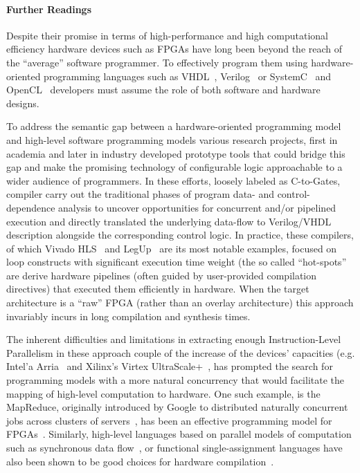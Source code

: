 \paragraph{Further Readings}
Despite their promise in terms of high-performance and high computational efficiency  hardware devices such as FPGAs have long been beyond the reach of the ``average'' software programmer. To effectively program them using hardware-oriented programming languages such as  VHDL~\cite{VHDLBook}, Verilog~\cite{VerilogBook} or SystemC~\cite{SystemC:ISSS01} and OpenCL~\cite{OpenCL} developers must assume the role of both software and hardware designs. 

To address the semantic gap between a hardware-oriented programming model and high-level software programming models various research projects, first in academia and later in industry developed prototype tools that could bridge this gap and make the promising technology of  configurable logic approachable to a wider audience of programmers.  In these efforts, loosely labeled as C-to-Gates, compiler carry out the traditional phases of program data- and control-dependence analysis to uncover opportunities for concurrent and/or pipelined execution and directly translated the underlying data-flow to Verilog/VHDL description alongside the corresponding control logic.   In practice, these compilers, of which Vivado HLS~\cite{Vivado} and LegUp~\cite{LegUp} are its most notable examples, focused on loop constructs with significant execution time weight (the so called ``hot-spots'' are derive hardware pipelines (often guided by user-provided compilation directives) that executed them efficiently in hardware. When the target architecture is a ``raw'' FPGA (rather than an overlay architecture) this approach invariably incurs in long compilation and synthesis times.

The inherent difficulties and limitations in extracting enough Instruction-Level Parallelism in these approach couple of the increase of the devices' capacities (e.g. Intel'a Arria~\cite{Arria} and Xilinx's Virtex UltraScale+~\cite{UltraScale}, has prompted the search for programming models with a more natural concurrency that would facilitate the mapping of high-level computation to hardware. One such example, is the MapReduce, originally introduced by Google to distributed naturally concurrent  jobs across clusters of servers~\cite{Dean:CACM08}, has been an effective programming model for FPGAs~\cite{Yeung:FCCM08}. Similarly, high-level languages based on parallel models of computation such as synchronous data flow~\cite{Lee:ProcIEEE87}, or functional single-assignment languages have  also been shown to be good choices for hardware  compilation~\cite{Hormati:CASES08,Hagiescu:DAC09,SAC:IJS02}.


